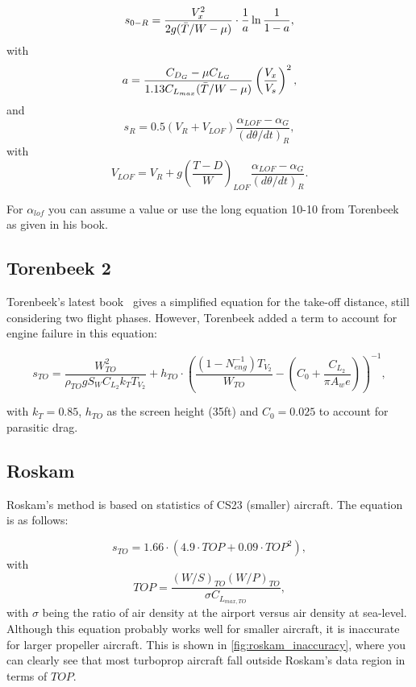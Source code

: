 \begin{equation}\label{eq:distance_zero_rotate}
    s_{0-R} = \frac{V_x^2}{2g(\Bar{T}/W-\mu)}\cdot \frac{1}{a}\ln{\frac{1}{1-a}},
\end{equation}
with
\begin{equation}\label{eq:torenbeek_a}
    a = \frac{C_{D_G}-\mu C_{L_G}}{1.13C_{L_{max}} (\Bar{T}/W-\mu)}\left(\frac{V_x}{V_s}\right)^2,
\end{equation}
and
\begin{equation}\label{eq:torenbeek_a}
    s_R = 0.5 (V_R+V_{LOF}) \frac{\alpha_{LOF}-\alpha_G}{(d\theta/dt)_R},
\end{equation}
with
\begin{equation}\label{eq:torenbeek_a}
    V_{LOF} = V_R + g \left(\frac{T-D}{W}\right)_{LOF}  \frac{\alpha_{LOF}-\alpha_G}{(d\theta/dt)_R}.
\end{equation}

For $\alpha_{lof}$ you can assume a value or use the long equation 10-10 from Torenbeek~\cite{torenbeek2013synthesis} as given in his book.

\subsection{Torenbeek 2}
Torenbeek's latest book~\cite{torenbeek2013advanced} gives a simplified equation for the take-off distance, still considering two flight phases. However, Torenbeek added a term to account for engine failure in this equation:

\begin{equation}\label{eq:Torenbeek2}
    s_{TO} = \frac{W_{TO}^2}{\rho_{TO} g S_W C_{L_2} k_T T_{V_2}} + h_{TO}\cdot \left(\frac{(1-N_{eng}^{-1})T_{V_2}}{W_{TO}} - \left(C_0 + \frac{C_{L_2}}{\pi A_w e}\right) \right)^{-1},
\end{equation}

with $k_T=0.85$, $h_{TO}$ as the screen height (35ft) and $C_0=0.025$ to account for parasitic drag.

\subsection{Roskam}
Roskam's method is based on statistics of CS23 (smaller) aircraft. The equation is as follows:

\begin{equation}\label{eq:Roskam}
    s_{TO} = 1.66 \cdot (4.9 \cdot TOP + 0.09 \cdot TOP^2),
\end{equation}
with
\begin{equation}\label{eq:Roskam_TOP}
    TOP=\frac{(W/S)_{TO}(W/P)_{TO}}{\sigma C_{L_{max,TO}}},
\end{equation}
with $\sigma$ being the ratio of air density at the airport versus air density at sea-level. Although this equation probably works well for smaller aircraft, it is inaccurate for larger propeller aircraft. This is shown in \autoref{fig:roskam_inaccuracy}, where you can clearly see that most turboprop aircraft fall outside Roskam's data region in terms of $TOP$.

